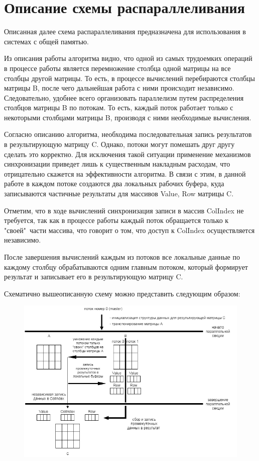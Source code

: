 \documentclass{report}
\begin{document}
\section*{Описание схемы распараллеливания}
\par Описанная далее схема распараллеливания предназначена для использования в системах с общей памятью.
\par Из описания работы алгоритма видно, что одной из самых трудоемких операций в процессе работы является перемножение столбца одной матрицы на все столбцы другой матрицы. То есть, в процессе вычислений перебираются столбцы матрицы B, после чего дальнейшая работа с ними происходит независимо. Следовательно, удобнее всего организовать параллелизм путем распределения столбцов матрицы B по потокам. То есть, каждый поток работает только с  некоторыми столбцами матрицы B, производя с ними необходимые вычисления. 
\par Согласно описанию алгоритма, необходима последовательная запись результатов в результирующую матрицу C. Однако, потоки могут помешать друг другу сделать это корректно. Для исключения такой ситуации применение механизмов синхронизации приведет лишь к существенным накладным расходам, что отрицательно скажется на эффективности алгоритма. В связи с этим, в данной работе в каждом потоке создаются два локальных рабочих буфера, куда записываются частичные результаты для массивов Value, Row матрицы C. 
\par Отметим, что в ходе вычислений синхронизация записи в массив ColIndex не требуется, так как в процессе работы каждый поток обращается только к "своей"\ части массива, что говорит о том, что доступ к ColIndex осуществляется независимо.
\par После завершения вычислений каждым из потоков все локальные данные по каждому столбцу обрабатываются одним главным потоком, который формирует результат и записывает его в результирующую матрицу C.
\par Схематично вышеописанную схему можно представить следующим образом:
 \begin{figure}[htbp]
	\centering
	\includegraphics[width=1\textwidth]{parallel_scheme.png}
\end{figure}
\newpage
\end{document}
